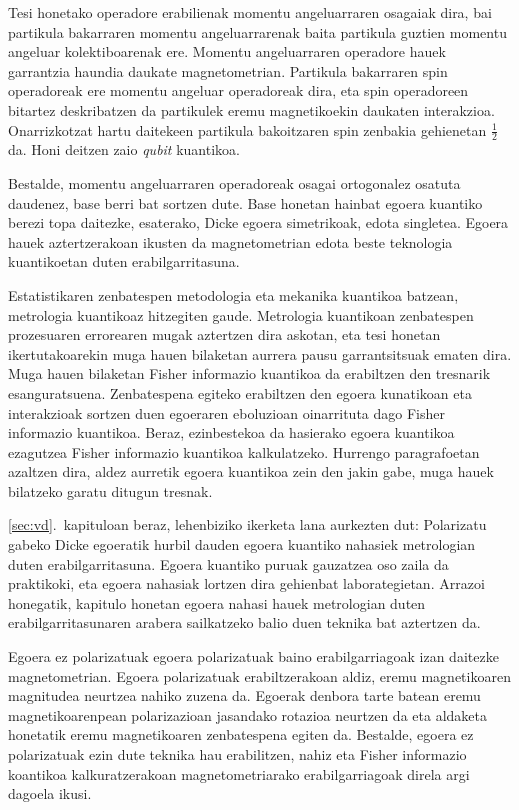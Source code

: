 Tesi honetako operadore erabilienak momentu angeluarraren osagaiak dira, bai partikula bakarraren momentu angeluarrarenak baita partikula guztien momentu angeluar kolektiboarenak ere.
Momentu angeluarraren operadore hauek garrantzia haundia daukate magnetometrian.
Partikula bakarraren spin operadoreak ere momentu angeluar operadoreak dira, eta spin operadoreen bitartez deskribatzen da partikulek eremu magnetikoekin daukaten interakzioa.
Onarrizkotzat hartu daitekeen partikula bakoitzaren spin zenbakia gehienetan $\frac{1}{2}$ da.
Honi deitzen zaio \emph{qubit} kuantikoa.

Bestalde, momentu angeluarraren operadoreak osagai ortogonalez osatuta daudenez, base berri bat sortzen dute.
Base honetan hainbat egoera kuantiko berezi topa daitezke, esaterako, Dicke egoera simetrikoak, edota singletea.
Egoera hauek aztertzerakoan ikusten da magnetometrian edota beste teknologia kuantikoetan duten erabilgarritasuna.

Estatistikaren zenbatespen metodologia eta mekanika kuantikoa batzean, metrologia kuantikoaz hitzegiten gaude.
Metrologia kuantikoan zenbatespen prozesuaren errorearen mugak aztertzen dira askotan, eta tesi honetan ikertutakoarekin muga hauen bilaketan aurrera pausu garrantsitsuak ematen dira.
Muga hauen bilaketan Fisher informazio kuantikoa da erabiltzen den tresnarik esanguratsuena.
Zenbatespena egiteko erabiltzen den egoera kunatikoan eta interakzioak sortzen duen egoeraren eboluzioan oinarrituta dago Fisher informazio kuantikoa.
Beraz, ezinbestekoa da hasierako egoera kuantikoa ezagutzea Fisher informazio kuantikoa kalkulatzeko.
Hurrengo paragrafoetan azaltzen dira, aldez aurretik egoera kuantikoa zein den jakin gabe, muga hauek bilatzeko garatu ditugun tresnak.

\ref{sec:vd}.~kapituloan beraz, lehenbiziko ikerketa lana aurkezten dut: Polarizatu gabeko Dicke egoeratik hurbil dauden egoera kuantiko nahasiek metrologian duten erabilgarritasuna.
Egoera kuantiko puruak gauzatzea oso zaila da praktikoki, eta egoera nahasiak lortzen dira gehienbat laborategietan.
Arrazoi honegatik, kapitulo honetan egoera nahasi hauek metrologian duten erabilgarritasunaren arabera sailkatzeko balio duen teknika bat aztertzen da.

Egoera ez polarizatuak egoera polarizatuak baino erabilgarriagoak izan daitezke magnetometrian.
Egoera polarizatuak erabiltzerakoan aldiz, eremu magnetikoaren magnitudea neurtzea nahiko zuzena da.
Egoerak denbora tarte batean eremu magnetikoarenpean polarizazioan jasandako  rotazioa neurtzen da eta aldaketa honetatik eremu magnetikoaren zenbatespena egiten da.
Bestalde, egoera ez polarizatuak ezin dute teknika hau erabilitzen, nahiz eta Fisher informazio koantikoa kalkuratzerakoan magnetometriarako erabilgarriagoak direla argi dagoela ikusi.

